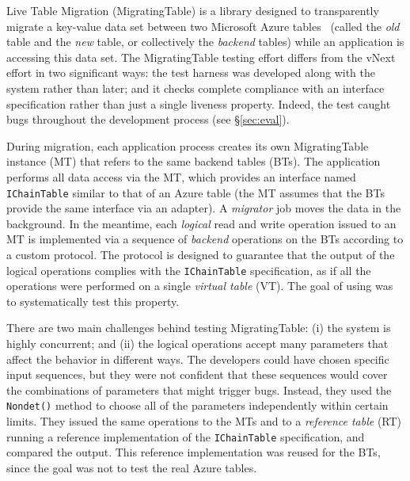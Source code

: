 Live Table Migration (MigratingTable) is a library designed to transparently migrate a key-value data set between two Microsoft Azure tables~\cite{azure-table} (called the \emph{old} table and the \emph{new} table, or collectively the \emph{backend} tables) while an application is accessing this data set. The MigratingTable testing effort differs from the vNext effort in two significant ways: the \psharp test harness was developed along with the system rather than later; and it checks complete compliance with an interface specification rather than just a single liveness property. Indeed, the \psharp test caught bugs throughout the development process (see \S\ref{sec:eval}).

%
During migration, each application process creates its own MigratingTable instance (MT) that refers to the same backend tables (BTs). The application performs all data access via the MT, which provides an interface named \texttt{IChainTable} similar to that of an Azure table (the MT assumes that the BTs provide the same interface via an adapter). A \emph{migrator} job moves the data in the background. In the meantime, each \emph{logical} read and write operation issued to an MT is implemented via a sequence of \emph{backend} operations on the BTs according to a custom protocol. The protocol is designed to guarantee that the output of the logical operations complies with the \texttt{IChainTable} specification, as if all the operations were performed on a single \emph{virtual table} (VT). The goal of using \psharp was to systematically test this property.

There are two main challenges behind testing MigratingTable: (i) the system is highly concurrent; and (ii) the logical operations accept many parameters that affect the behavior in different ways. The developers could have chosen specific input sequences, but they were not confident that these sequences would cover the combinations of parameters that might trigger bugs. Instead, they used the \psharp \texttt{Nondet()} method to choose all of the parameters independently within certain limits. They issued the same operations to the MTs and to a \emph{reference table} (RT) running a reference implementation of the \texttt{IChainTable} specification, and compared the output. This reference implementation was reused for the BTs, since the goal was not to test the real Azure tables.

